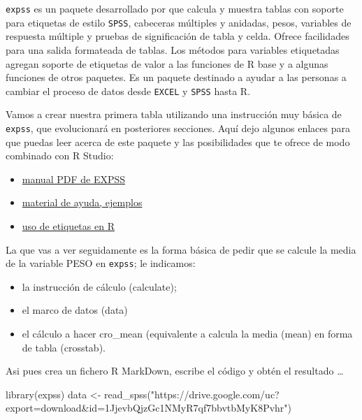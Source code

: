 \documentclass[
]{book}
\newenvironment{Shaded}{\begin{snugshade}}{\end{snugshade}}
\newcommand{\FunctionTok}[1]{\textcolor[rgb]{0.00,0.00,0.00}{#1}}
\newcommand{\NormalTok}[1]{#1}
\newcommand{\OtherTok}[1]{\textcolor[rgb]{0.56,0.35,0.01}{#1}}
\newcommand{\StringTok}[1]{\textcolor[rgb]{0.31,0.60,0.02}{#1}}
\providecommand{\tightlist}{%
  \setlength{\itemsep}{0pt}\setlength{\parskip}{0pt}}
\begin{document}
\texttt{expss} es un paquete desarrollado por \citet{expss} que calcula y muestra tablas con soporte para etiquetas de estilo \texttt{SPSS}, cabeceras múltiples y anidadas, pesos, variables de respuesta múltiple y pruebas de significación de tabla y celda. Ofrece facilidades para una salida formateada de tablas. Los métodos para variables etiquetadas agregan soporte de etiquetas de valor a las funciones de R base y a algunas funciones de otros paquetes. Es un paquete destinado a ayudar a las personas a cambiar el proceso de datos desde \texttt{EXCEL} y \texttt{SPSS} hasta R.

Vamos a crear nuestra primera tabla utilizando una instrucción muy básica de \texttt{expss}, que evolucionará en posteriores secciones. Aquí dejo algunos enlaces para que puedas leer acerca de este paquete y las posibilidades que te ofrece de modo combinado con R Studio:

\begin{itemize}
\tightlist
\item
  \href{https://cran.r-project.org/web/packages/expss/expss.pdf}{manual PDF de EXPSS}
\item
  \href{https://cran.r-project.org/web/packages/expss/vignettes/tables-with-labels.html}{material de ayuda, ejemplos}
\item
  \href{https://cran.r-project.org/web/packages/expss/vignettes/labels-support.html}{uso de etiquetas en R}
\end{itemize}

La que vas a ver seguidamente es la forma básica de pedir que se calcule la media de la variable PESO en \texttt{expss}; le indicamos:

\begin{itemize}
\tightlist
\item
  la instrucción de cálculo (calculate);
\item
  el marco de datos (data)
\item
  el cálculo a hacer cro\_mean (equivalente a calcula la media (mean) en forma de tabla (crosstab).
\end{itemize}

Asi pues crea un fichero R MarkDown, escribe el código y obtén el resultado \ldots{}

\begin{Shaded}
\begin{Highlighting}[]
\FunctionTok{library}\NormalTok{(expss)}
\NormalTok{data }\OtherTok{\textless{}{-}} \FunctionTok{read\_spss}\NormalTok{(}\StringTok{"https://drive.google.com/uc?export=download\&id=1JjevbQjzGc1NMyR7qf7bbvtbMyK8Pvhr"}\NormalTok{)}
\end{Highlighting}
\end{Shaded}
\end{document}
